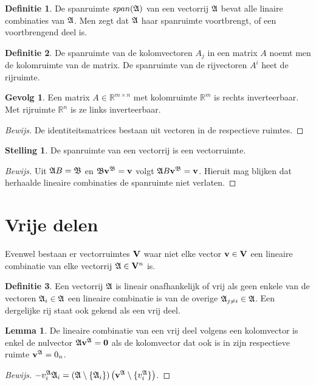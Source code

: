 \documentclass{amsart}
\theoremstyle{definition}
\newtheorem{thm}{Stelling}[section]
\newtheorem{lmm}{Lemma}[section]
\newtheorem{dfn}{Definitie}[section]
\newtheorem{csq}{Gevolg}[section]
\newenvironment{bewijs}{\begin{proof}[Bewijs]}{\end{proof}}
\newcommand{\setsm}[1]{\{{#1}\}}
\newcommand{\without}[1]{\setminus\setsm{#1}}
\newcommand{\realnums}{\mathbb{R}}
\newcommand{\realn}[1][n]{\realnums^{#1}}
\newcommand{\realmx}[2][n]{\realn[#2 \times #1]}
\newcommand{\realmxn}{\realmx{m}}
\newcommand{\vecspace}[1][v]{\mathrm{\mathbf{\MakeUppercase#1}}}
\newcommand{\vecspacen}[1][n]{\vecspace^#1}
\newcommand{\vvec}[1][v]{\mathbf{#1}}
\newcommand{\zerovec}{\vvec[0]}
\newcommand{\vecrow}[1][a]{\mathfrak{\MakeUppercase{#1}}}
\newcommand{\rvec}[2][i]{{#2}_{#1}}
\newcommand{\rvecr}[2][i]{\rvec[#1]{\vecrow[#2]}}
\newcommand{\rveci}[1][i]{\rvecr[#1]{a}}
\newcommand{\cvec}[2]{{#1}^{#2}}
\newcommand{\cvecv}[2][v]{\cvec{\vvec[#1]}{#2}}
\newcommand{\cvecva}[1][a]{\cvecv{\vecrow[#1]}}
\newcommand{\cvecc}[2][a]{\cvecv[#2]{\vecrow[#1]}}
\newcommand{\cvecvv}[1][v]{\cvecc{#1}}
\newcommand{\vcord}[3]{{#1}_{#2}^{#3}}
\newcommand{\vcordv}[3][v]{\vcord{#1}{#2}{\vecrow[#3]}}
\newcommand{\vcordvi}[2][i]{\vcordv{#1}{#2}}
\newcommand{\vcordvia}[1][i]{\vcordvi[#1]{a}}
\begin{document}
\begin{dfn}
    De spanruimte $span(\vecrow)$ van een vectorrij $\vecrow$ bevat alle linaire combinaties van $\vecrow$.
    Men zegt dat $\vecrow$ haar spanruimte voortbrengt, of een voortbrengend deel is.
\end{dfn}

\begin{dfn}
    De spanruimte van de kolomvectoren $A_j$ in een matrix $A$ noemt men de kolomruimte van de matrix.
    De spanruimte van de rijvectoren $A^i$ heet de rijruimte.
\end{dfn}

\begin{csq}
    Een matrix $A \in \realmxn$ met kolomruimte $\realn[m]$ is rechts inverteerbaar.
    Met rijruimte $\realn$ is ze links inverteerbaar.
    \begin{bewijs}
        De identiteitsmatrices bestaan uit vectoren in de respectieve ruimtes.
    \end{bewijs}
\end{csq}

\begin{thm}
    De spanruimte van een vectorrij is een vectorruimte.
    \begin{bewijs}
        Uit $\vecrow B = \vecrow[b]$ en $\vecrow[b] \cvecva[b]= \vvec$ volgt $\vecrow B \cvecva[b] = \vvec$.
        Hieruit mag blijken dat herhaalde lineaire combinaties de spanruimte niet verlaten.
    \end{bewijs}
\end{thm}

\section{Vrije delen}

Evenwel bestaan er vectorruimtes $\vecspace$ waar niet elke vector $\vvec \in \vecspace$ een lineaire combinatie van elke vectorrij $\vecrow \in \vecspacen$ is.

\begin{dfn}
    Een vectorrij $\vecrow$ is lineair onafhankelijk of vrij als geen enkele van de vectoren $\vecrow_i \in \vecrow$ een lineaire combinatie is van de overige $\vecrow_{j\neq i} \in \vecrow$.
    Een dergelijke rij staat ook gekend als een vrij deel.
\end{dfn}

\begin{lmm}
    De lineaire combinatie van een vrij deel volgens een kolomvector is enkel de nulvector $\vecrow \cvecvv = \zerovec$ als de kolomvector dat ook is in zijn respectieve ruimte $\cvecvv = 0_n$.
    \begin{bewijs}
        $-\vcordvia \vecrow_i = \left(\vecrow \without{\rveci}\right)\left(\cvecvv \without{\vcordvia}\right)$.
    \end{bewijs}
\end{lmm}
\end{document}
